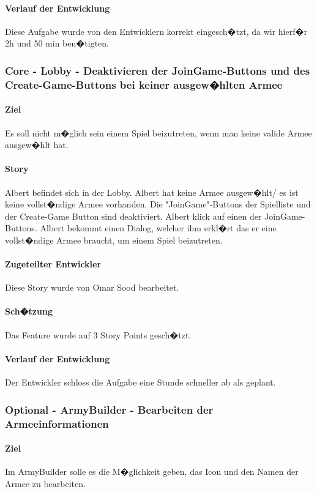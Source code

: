\documentclass[12pt, titlepage]{scrartcl}
\begin{document}
			\paragraph{Verlauf der Entwicklung} 
			Diese Aufgabe wurde von den Entwicklern korrekt eingesch�tzt, da wir hierf�r 2h und 50 min ben�tigten.
			
			\subsubsection{Core - Lobby - Deaktivieren der JoinGame-Buttons und des Create-Game-Buttons bei keiner ausgew�hlten Armee}
			\paragraph{Ziel} Es soll nicht m�glich sein einem Spiel beizutreten, wenn man keine valide Armee ausgew�hlt hat.
			\paragraph{Story} Albert befindet sich in der Lobby. Albert hat keine Armee ausgew�hlt/ es ist keine vollst�ndige Armee vorhanden. Die "JoinGame"-Buttons der Spielliste und der Create-Game Button sind deaktiviert. Albert klick auf einen der JoinGame-Buttons. Albert bekommt einen Dialog, welcher ihm erkl�rt das er eine vollst�ndige Armee braucht, um einem Spiel beizutreten.
			\paragraph{Zugeteilter Entwickler} Diese Story wurde von Omar Sood bearbeitet.
			\paragraph{Sch�tzung}
			Das Feature wurde auf 3 Story Points gesch�tzt.
			\paragraph{Verlauf der Entwicklung} 
			Der Entwickler schloss die Aufgabe eine Stunde schneller ab als geplant.
			
			\subsubsection{Optional - ArmyBuilder - Bearbeiten der Armeeinformationen}
			\paragraph{Ziel} Im ArmyBuilder solle es die M�glichkeit geben, das Icon und den Namen der Armee zu bearbeiten.
\end{document}
